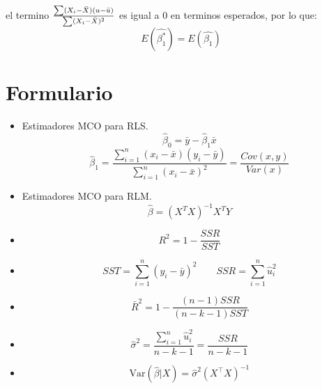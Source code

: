\documentclass[10pt,a4paper]{article}
\begin{document}
\begin{enumerate}
el termino $\frac{\sum (X_i-\Bar{X})(u-\Bar{u})}{\sum (X_i-\Bar{X})^2}$ es igual a 0 en terminos esperados, por lo que:
 $$E(\hat{\beta_1^*}) = E(\hat{\beta_1})$$




\end{enumerate}

\section{Formulario}


\begin{itemize}

\item  Estimadores MCO para RLS.
{
$$\hat{\beta}_0 = \bar{y} - \hat{\beta}_1 \bar{x} $$
$$\hat{\beta}_1 = \frac{\sum_{i=1}^{n}(x_i - \bar{x})(y_i-\bar{y})}{\sum_{i=1}^{n}(x_i - \bar{x})^2}=\frac{Cov(x,y)}{Var(x)}$$}


\item  Estimadores MCO para RLM.
{
$${\hat{\beta}} = (X^TX)^{-1} X^TY $$}


    \item \[ R^2  = 1 - \frac{SSR}{SST} \] 
\item  $$SST = \sum_{i=1}^{n} (y_i - \bar{y})^2 \quad \quad SSR = \sum_{i=1}^{n}  \hat{u}_i^2 $$
    \item \[ \bar{R}^2 =  1 - \frac{(n-1)SSR}{(n-k-1)SST} \]

    \item  $$\hat{\sigma}^2 = \frac{\sum_{i=1}^{n} \hat{u}_i^2 }{n-k-1}= \frac{SSR}{n - k - 1}$$
    \item \[
\text{Var}(\hat{\beta}|X) = \hat{\sigma}^2(X^{\top}X)^{-1}
\]
    \end{itemize}
\end{document}
